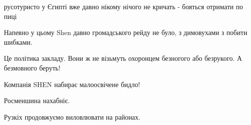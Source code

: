 \begin{itemize}
 
русотуристо у Єгипті вже давно нікому нічого не кричать - бояться отримати по пиці 🤫😎

 

Напевно у цьому Shen давно громадського рейду не було, з димовухами з побити шибками.

 
Це політика закладу.
Вони ж не візьмуть охоронцем безногого або безрукого. А безмовного беруть!

 
Компанія SHEN набирає малоосвічене бидло!

 
Росменшина нахабніє.

 
Рузкіх продовжуємо виловлювати на районах.

 

\end{itemize}
